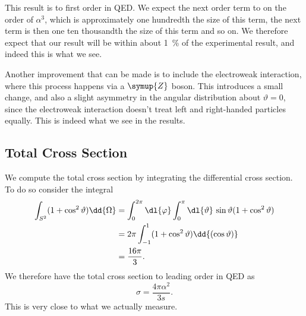 \documentclass[fleqn]{NotesClass}
\newcommand{\Pparticle}[1]{\symup{#1}}
\newcommand{\PZ}{\ensuremath{\Pparticle{Z}}}
\begin{document}
    This result is to first order in QED.
    We expect the next order term to on the order of \(\alpha^3\), which is approximately one hundredth the size of this term, the next term is then one ten thousandth the size of this term and so on.
    We therefore expect that our result will be within about \qty{1}{\percent} of the experimental result, and indeed this is what we see.
    
    Another improvement that can be made is to include the electroweak interaction, where this process happens via a \PZ{} boson.
    This introduces a small change, and also a slight asymmetry in the angular distribution about \(\vartheta = 0\), since the electroweak interaction doesn't treat left and right-handed particles equally.
    This is indeed what we see in the results.
    
    \subsection{Total Cross Section}
    We compute the total cross section by integrating the differential cross section.
    To do so consider the integral
    \begin{align}
        \int_{S^2} (1 + \cos^2\vartheta) \dd{\Omega} &= \int_{0}^{2\pi} \dl{\varphi} \int_{0}^{\pi} \dl{\vartheta} \, \sin\vartheta(1 + \cos^2\vartheta)\\
        &= 2\pi \int_{-1}^{1} (1 + \cos^2\vartheta) \dd{(\cos\vartheta)}\\
        &= \frac{16\pi}{3}.
    \end{align}
    We therefore have the total cross section to leading order in QED as
    \begin{equation}
        \sigma = \frac{4\pi\alpha^2}{3s}.
    \end{equation}
    This is very close to what we actually measure.
    
    \appendixpage
    \begin{appendices}
        
        
        
        
    \end{appendices}
    
    \backmatter
    \renewcommand{\glossaryname}{Acronyms}
    \printglossary[acronym]
    \printindex
\end{document}
